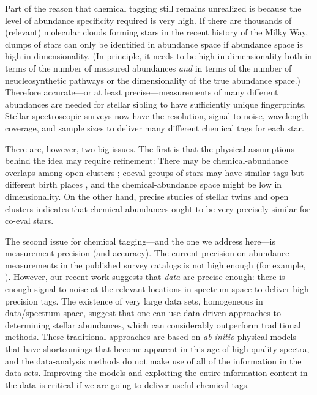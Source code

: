 \documentclass[12pt, letterpaper, preprint]{aastex}
\newcommand{\foreign}[1]{\textsl{#1}}
\begin{document}
Part of the reason that chemical tagging still remains unrealized
is because the level of abundance specificity required
is very high.
If there are thousands of (relevant) molecular clouds forming stars in
the recent history of the Milky Way, clumps of stars can only be
identified in abundance space if abundance space is high in dimensionality.
(In principle, it needs to be high in dimensionality both in terms
of the number of measured abundances \emph{and} in terms of the number of
neucleosynthetic pathways or the dimensionality of the true abundance
space.)
Therefore accurate---or at
least precise---measurements of many different abundances are needed
for stellar sibling to have sufficiently unique fingerprints.
Stellar spectroscopic surveys now have the resolution,
signal-to-noise, wavelength coverage, and sample sizes to deliver many
different chemical tags for each star.

There are, however, two big issues.
The first is that the physical assumptions behind the idea may require
refinement:
There may be chemical-abundance overlaps among open clusters
\citep{blancocuaresma}; coeval groups of stars may have similar tags
but different birth places \citep{mitschang}, and the
chemical-abundance space might be low in dimensionality.
On the other hand, precise studies of stellar twins \citep{melendez, jofre}
and open clusters \citep{bovy} indicates that chemical abundances ought to be
very precisely similar for co-eval stars.

The second issue for chemical tagging---and the one we address
here---is measurement precision (and accuracy).
The current precision on abundance measurements in the published
survey catalogs is not high enough (for example, \citealt{martell,
  ting}).
However, our recent work \citep{thecannon} suggests that \emph{data}
are precise enough: there is enough signal-to-noise at the relevant
locations in spectrum space to deliver high-precision tags.
The existence of very large data sets, homogeneous in data/spectrum
space, suggest that one can use data-driven approaches to determining
stellar abundances, which can considerably outperform traditional
methods.
These traditional approaches are based on \foreign{ab-initio} physical models
that have shortcomings that become apparent in this age of
high-quality spectra, and the data-analysis methods do not make use of
all of the information in the data sets.
Improving the models and exploiting the entire information
content in the data is critical if we are going to deliver useful
chemical tags.
\end{document}
